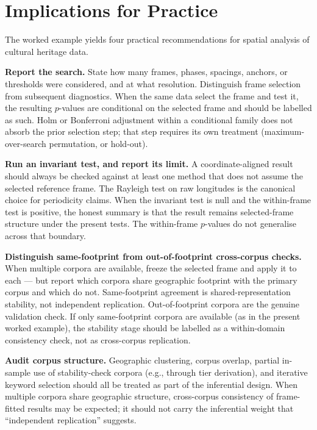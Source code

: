 \documentclass[12pt,a4paper]{article}
\begin{document}
\section{Implications for Practice}
\label{sec:practice}

The worked example yields four practical recommendations for spatial
analysis of cultural heritage data.

\textbf{Report the search.} State how many frames, phases, spacings,
anchors, or thresholds were considered, and at what resolution.
Distinguish frame selection from subsequent diagnostics. When the
same data select the frame and test it, the resulting $p$-values are
conditional on the selected frame and should be labelled as such.
Holm or Bonferroni adjustment within a conditional family does not
absorb the prior selection step; that step requires its own treatment
(maximum-over-search permutation, or hold-out).

\textbf{Run an invariant test, and report its limit.} A coordinate-aligned
result should always be checked against at least one method that does
not assume the selected reference frame. The Rayleigh test on raw
longitudes is the canonical choice for periodicity claims. When the
invariant test is null and the within-frame test is positive, the
honest summary is that the result remains selected-frame structure
under the present tests. The within-frame $p$-values do not generalise
across that boundary.

\textbf{Distinguish same-footprint from out-of-footprint cross-corpus
checks.} When multiple corpora are available, freeze the selected
frame and apply it to each --- but report which corpora share
geographic footprint with the primary corpus and which do not.
Same-footprint agreement is shared-representation stability, not
independent replication. Out-of-footprint corpora are the genuine
validation check. If only same-footprint corpora are available
(as in the present worked example), the stability stage should be
labelled as a within-domain consistency check, not as cross-corpus
replication.

\textbf{Audit corpus structure.} Geographic clustering, corpus
overlap, partial in-sample use of stability-check corpora (e.g.,
through tier derivation), and iterative keyword selection should all
be treated as part of the inferential design. When multiple corpora
share geographic structure, cross-corpus consistency of frame-fitted
results may be expected; it should not carry the
inferential weight that ``independent replication'' suggests.
\end{document}
